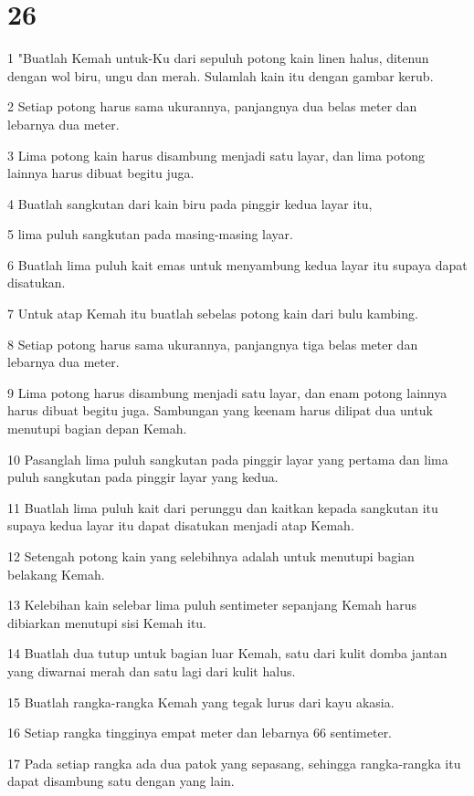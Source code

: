 \chapter{26}

\par 1 "Buatlah Kemah untuk-Ku dari sepuluh potong kain linen halus, ditenun dengan wol biru, ungu dan merah. Sulamlah kain itu dengan gambar kerub.
\par 2 Setiap potong harus sama ukurannya, panjangnya dua belas meter dan lebarnya dua meter.
\par 3 Lima potong kain harus disambung menjadi satu layar, dan lima potong lainnya harus dibuat begitu juga.
\par 4 Buatlah sangkutan dari kain biru pada pinggir kedua layar itu,
\par 5 lima puluh sangkutan pada masing-masing layar.
\par 6 Buatlah lima puluh kait emas untuk menyambung kedua layar itu supaya dapat disatukan.
\par 7 Untuk atap Kemah itu buatlah sebelas potong kain dari bulu kambing.
\par 8 Setiap potong harus sama ukurannya, panjangnya tiga belas meter dan lebarnya dua meter.
\par 9 Lima potong harus disambung menjadi satu layar, dan enam potong lainnya harus dibuat begitu juga. Sambungan yang keenam harus dilipat dua untuk menutupi bagian depan Kemah.
\par 10 Pasanglah lima puluh sangkutan pada pinggir layar yang pertama dan lima puluh sangkutan pada pinggir layar yang kedua.
\par 11 Buatlah lima puluh kait dari perunggu dan kaitkan kepada sangkutan itu supaya kedua layar itu dapat disatukan menjadi atap Kemah.
\par 12 Setengah potong kain yang selebihnya adalah untuk menutupi bagian belakang Kemah.
\par 13 Kelebihan kain selebar lima puluh sentimeter sepanjang Kemah harus dibiarkan menutupi sisi Kemah itu.
\par 14 Buatlah dua tutup untuk bagian luar Kemah, satu dari kulit domba jantan yang diwarnai merah dan satu lagi dari kulit halus.
\par 15 Buatlah rangka-rangka Kemah yang tegak lurus dari kayu akasia.
\par 16 Setiap rangka tingginya empat meter dan lebarnya 66 sentimeter.
\par 17 Pada setiap rangka ada dua patok yang sepasang, sehingga rangka-rangka itu dapat disambung satu dengan yang lain.

